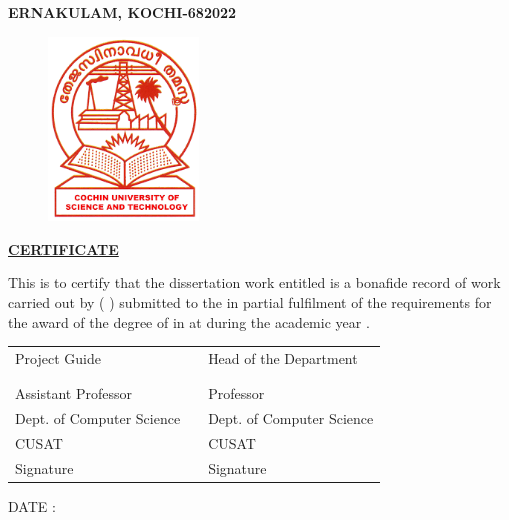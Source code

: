 \thispagestyle{empty}

\begin{center}
    {\large \bfseries \MakeUppercase {\mydep}\par}
    {\large \bfseries \MakeUppercase {\myuni}\par}
    {\large \bfseries \MakeUppercase {ERNAKULAM, KOCHI-682022}\par}

    \vspace{0.5\baselineskip}
    {\begin{figure}[!h] 
	\centering
	\includegraphics[width=40mm]{./Images/cusat.png} 
     \end{figure}
    }
    {\Large \bfseries  \MakeUppercase{\underline {certificate}}\par}
\end{center}

\vspace{\baselineskip}

\noindent
This is to certify that the dissertation work entitled \mytitle{} is a bonafide record of work carried out by \myname{} ( \myregnum{} ) submitted to the \mydep{} in partial fulfilment of the requirements for the award of the degree of \mydegree{} in \myspecialization{} at \myuni{} during the academic year \myyear{}.

\vspace{2\baselineskip}

\noindent
\begin{tabularx}{\textwidth}{@{}l  X  l}
    Project Guide & & Head of the Department\\
    \\
    \textbf{\myguide{}} & & \textbf{\myhod{}}\\
    Assistant Professor & & Professor\\
    Dept. of Computer Science & & Dept. of Computer Science\\
    CUSAT & & CUSAT\\
    Signature & & Signature
\end{tabularx}

\vspace{4\baselineskip}
\noindent
{DATE : \mydate{} \mymonth{} \myyear{} \par}
